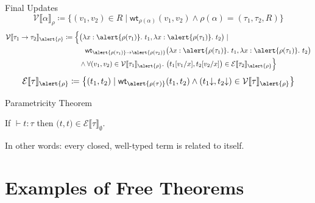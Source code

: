 \documentclass{beamer}
\newcommand{\denot}[1]{\llbracket#1\rrbracket}
\newcommand{\vint}[1]{\mathcal{V}\denot{#1}}
\newcommand{\tint}[1]{\mathcal{E}\denot{#1}}
\newcommand{\wt}[1]{\mathsf{wt}_{#1}}
\newcommand{\suc}{\mathsf{succ}}
\newcommand{\nf}[1]{#1{\downarrow}}
\newcommand{\eqnf}{=^*}
\begin{document}
\begin{frame}{Final Updates}
\begin{equation*}
  \vint{\alpha}_\rho\coloneqq
  \bigl\{(v_1,v_2) \in R \mid
  \wt{\rho(\alpha)}(v_1,v_2) \land \rho(\alpha)=(\tau_1,\tau_2,R) \bigr\}
\end{equation*}
\pause
\begin{align*}
  \vint{\tau_1\to\tau_2}_{\alert{\rho}}\coloneqq
    \Bigl\{&\bigl(\lambda x : \alert{\rho(\tau_1)}.\ t_1, \lambda x : \alert{\rho(\tau_1)}.\ t_2\bigr) \mid\\
&\phantom{\land\, }\wt{\alert{\rho(\tau_1)}\to\alert{\rho(\tau_2)}}\bigl(\lambda x : \alert{\rho(\tau_1)}.\ t_1, \lambda x : \alert{\rho(\tau_1)}.\ t_2\bigr)\\
& \land \forall (v_1,v_2)\in\vint{\tau_1}_{\alert{\rho}}.\ \bigl(t_1[v_1/x],t_2[v_2/x]\bigr)\in\tint{\tau_2}_{\alert{\rho}} \Bigr\}
\end{align*}
\begin{align*}
  \tint{\tau}_{\alert{\rho}}\coloneqq\bigl\{(t_1,t_2)\mid
  \wt{\alert{\rho(\tau)}}(t_1,t_2)\land (\nf{t_1},\nf{t_2})\in\vint{\tau}_{\alert{\rho}}\bigr\}
\end{align*}
\end{frame}

\begin{frame}{Parametricity Theorem}
\begin{theorem}
  If $\vdash t : \tau$ then
  $(t,t\bigr)\in\tint{\tau}_\emptyset$.
\end{theorem}

\large In other words: \alert{every closed, well-typed term is related to itself.}

\end{frame}

\section{Examples of Free Theorems}



\end{document}
